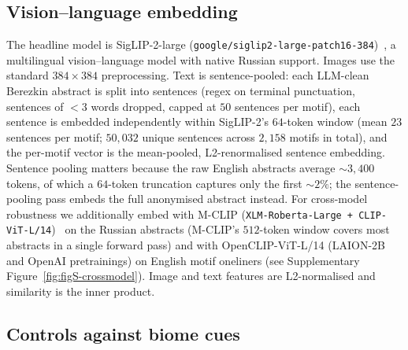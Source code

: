 \documentclass[11pt,a4paper]{article}
\begin{document}
\subsection*{Vision--language embedding}

The headline model is SigLIP-2-large
(\texttt{google/siglip2-large-patch16-384})~\citep{tschannen2024siglip2},
a multilingual vision--language model with native Russian support.
Images use the standard $384\times 384$ preprocessing. Text is
sentence-pooled: each LLM-clean Berezkin abstract is split into
sentences (regex on terminal punctuation, sentences of $<3$ words
dropped, capped at $50$ sentences per motif), each sentence is
embedded independently within SigLIP-2's $64$-token window
(mean $23$ sentences per motif; $50{,}032$ unique sentences across
$2{,}158$ motifs in total), and the per-motif vector is the
mean-pooled, L2-renormalised sentence embedding. Sentence pooling
matters because the raw English abstracts average $\sim 3{,}400$
tokens, of which a $64$-token truncation captures only the first
$\sim 2\%$; the sentence-pooling pass embeds the full anonymised
abstract instead. For cross-model robustness we additionally embed
with M-CLIP (\texttt{XLM-Roberta-Large + CLIP-ViT-L/14})~\citep{carlsson2022mclip}
on the Russian abstracts (M-CLIP's $512$-token window covers most
abstracts in a single forward pass) and with OpenCLIP-ViT-L/14
(LAION-2B and OpenAI pretrainings) on English motif oneliners
(see Supplementary Figure~\ref{fig:figS-crossmodel}). Image and
text features are L2-normalised and similarity is the inner
product.

\subsection*{Controls against biome cues}
\end{document}
